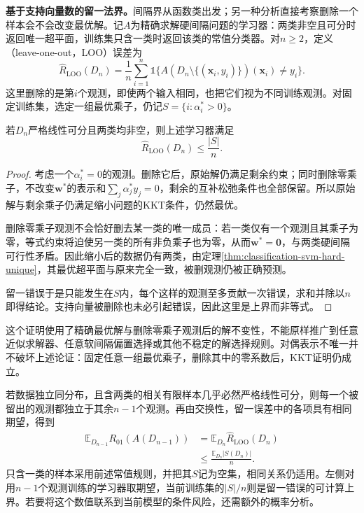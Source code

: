 \label{sec:classification-svm-loo}

\textbf{基于支持向量数的留一法界。}间隔界从函数类出发；另一种分析直接考察删除一个样本会不会改变最优解。记$A$为精确求解硬间隔问题的学习器：两类非空且可分时返回唯一超平面，训练集只含一类时返回该类的常值分类器。对$n\ge2$，定义（leave-one-out，LOO）误差为
\begin{equation}
  \widehat R_{\mathrm{LOO}}(D_n)
  =\frac1n\sum_{i=1}^n
    \mathbb{1}\bigl\{
       A(D_n\setminus\{(\bm{x}_i,y_i)\})(\bm{x}_i)
       \ne y_i
     \bigr\}.
  \label{eq:classification-svm-loo-definition}
\end{equation}
这里删除的是第$i$个观测，即使两个输入相同，也把它们视为不同训练观测。对固定训练集，选定一组最优乘子，仍记$S=\{i:\alpha_i^{\ast}>0\}$。

\begin{theorem}[硬间隔的支持向量计数界]
  \label{thm:classification-svm-loo-bound}
  若$D_n$严格线性可分且两类均非空，则上述学习器满足
  \[
    \widehat R_{\mathrm{LOO}}(D_n)\le\frac{|S|}{n}.
  \]
\end{theorem}
\begin{proof}
考虑一个$\alpha_i^{\ast}=0$的观测。删除它后，原始解仍满足剩余约束；同时删除零乘子，不改变$\bm{w}^{\ast}$的表示和$\sum_j\alpha_j^{\ast}y_j=0$，剩余的互补松弛条件也全部保留。所以原始解与剩余乘子仍满足缩小问题的KKT条件，仍然最优。

删除零乘子观测不会恰好删去某一类的唯一成员：若一类仅有一个观测且其乘子为零，等式约束将迫使另一类的所有非负乘子也为零，从而$\bm{w}^{\ast}=\bm{0}$，与两类硬间隔可行性矛盾。因此缩小后的数据仍有两类，由定理\ref{thm:classification-svm-hard-unique}，其最优超平面与原来完全一致，被删观测仍被正确预测。

留一错误于是只能发生在$S$内，每个这样的观测至多贡献一次错误，求和并除以$n$即得结论。支持向量被删除也未必引起错误，因此这里是上界而非等式。
\end{proof}

这个证明使用了精确最优解与删除零乘子观测后的解不变性，不能原样推广到任意近似求解器、任意软间隔偏置选择或其他不稳定的解选择规则。对偶表示不唯一并不破坏上述论证：固定任意一组最优乘子，删除其中的零系数后，KKT证明仍成立。

若数据独立同分布，且含两类的相关有限样本几乎必然严格线性可分，则每一个被留出的观测都独立于其余$n-1$个观测。再由交换性，留一误差中的各项具有相同期望，得到
\begin{equation}
  \begin{aligned}
    \mathbb{E}_{D_{n-1}}R_{01}(A(D_{n-1}))
      &=\mathbb{E}_{D_n}\widehat R_{\mathrm{LOO}}(D_n)\\
      &\le\frac{\mathbb{E}_{D_n}|S(D_n)|}{n}.
  \end{aligned}
  \label{eq:classification-svm-loo-expectation}
\end{equation}
只含一类的样本采用前述常值规则，并把其$S$记为空集，相同关系仍适用。左侧对用$n-1$个观测训练的学习器取期望，当前训练集的$|S|/n$则是留一错误的可计算上界。若要将这个数值联系到当前模型的条件风险，还需额外的概率分析。

